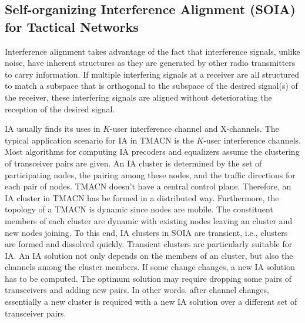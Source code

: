 \documentclass[letterpaper,11pt,onecolumn]{article}
\begin{document}


\subsection{Self-organizing Interference Alignment (SOIA) for Tactical Networks}

Interference alignment takes advantage of the fact that interference signals, unlike noise, have inherent structures as they are generated by other radio transmitters to carry information. If multiple interfering signals at a receiver are all structured to match a subspace that is orthogonal to the subspace of the desired signal(s) of the receiver, these interfering signals are aligned without deteriorating the reception of the desired signal. 

IA usually finds its uses in $K$-user interference channel and X-channels. The typical application scenario for IA in TMACN is the $K$-user interference channels. Most algorithms for computing IA precoders and equalizers assume the clustering of transceiver pairs are given. An IA cluster is determined by the set of participating nodes,  the pairing among these nodes, and the traffic directions for each pair of nodes. TMACN doesn't have a central control plane. Therefore, an IA cluster in TMACN has be formed in a distributed way. Furthermore, the topology of a TMACN is dynamic since nodes are mobile. The constituent members of each cluster are dynamic with existing nodes leaving an cluster and new nodes joining. To this end, IA clusters in SOIA are transient, i.e., clusters are formed and dissolved quickly. Transient clusters are particularly suitable for IA. An IA solution not only depends on the members of an cluster, but also the channels among the cluster members. If some change changes, a new IA solution has to be computed. The optimum solution may require dropping some pairs of transceivers and adding new pairs. In other words, after channel changes, essentially a new cluster is required with a new IA solution over a different set of transceiver pairs. 
\end{document}
